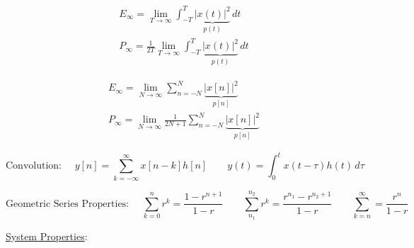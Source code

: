 \begin{multicols}{2}

  \begin{equation*}
    \begin{split}
      E_{\infty}=\lim_{T\to\infty}\int_{-T}^{T} \underbrace{|x(t)|^2}_{p(t)}\,dt\\
      P_{\infty}=\frac{1}{2T}\lim_{T\to\infty}\int_{-T}^{T} \underbrace{|x(t)|^2}_{p(t)}\,dt
    \end{split}
    \label{7}
  \end{equation*}

  \begin{equation*}
    \begin{split}
      E_{\infty}=\lim_{N\to\infty}\sum_{n=-N}^{N} \underbrace{|x[n]|^2}_{p[n]}\\
      P_{\infty}=\lim_{N\to\infty}\frac{1}{2N+1}\sum_{n=-N}^{N} \underbrace{|x[n]|^2}_{p[n]}
    \end{split}
    \label{8}
  \end{equation*}

\end{multicols}

\vspace{-10pt}

$$\boxed{\text{Convolution: }\quad y[n]=\sum_{k=-\infty}^{\infty}x[n-k]h[n]\quad\quad y(t)=\int_0^t x(t-\tau)h(t)\,d\tau}$$

\vspace{-10pt}

$$\boxed{\text{Geometric Series Properties: }\quad \sum_{k=0}^{n}r^k=\frac{1-r^{n+1}}{1-r}\quad\quad\sum_{n_1}^{n_2}r^k=\frac{r^{n_1}-r^{n_2+1}}{1-r}\quad\quad\sum_{k=n}^{\infty}=\frac{r^{n}}{1-r}}$$

\newpage
\begin{center}
  \underline{System Properties}:
\end{center}

\vspace{-35pt}

